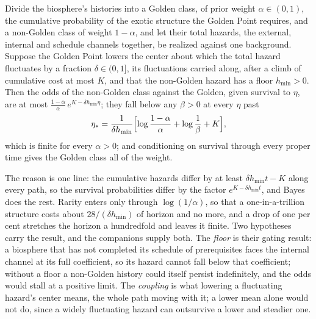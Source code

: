 \begin{proposition}\label{prop:emergence}
Divide the biosphere's histories into a Golden class, of prior weight
$\alpha\in(0,1)$, the cumulative probability of the exotic structure the
Golden Point requires, and a non-Golden class of weight $1-\alpha$, and
let their total hazards, the external, internal and schedule channels
together, be realized against one background. Suppose the Golden Point
lowers the center about which the total hazard fluctuates by a fraction
$\delta\in(0,1]$, its fluctuations carried along, after a climb of
cumulative cost at most $K$, and that the non-Golden hazard has a floor
$h_{\min}>0$. Then the odds of the non-Golden class against the Golden,
given survival to $\eta$, are at most
$\frac{1-\alpha}{\alpha}\,e^{K-\delta h_{\min}\eta}$; they fall below any
$\beta>0$ at every $\eta$ past
\[
\eta_\ast=\frac{1}{\delta h_{\min}}\Bigl[\log\frac{1-\alpha}{\alpha}
+\log\frac{1}{\beta}+K\Bigr],
\]
which is finite for every $\alpha>0$; and conditioning on survival through
every proper time gives the Golden class all of the weight.
\end{proposition}

\noindent The reason is one line: the cumulative hazards differ by at least
$\delta h_{\min}t-K$ along every path, so the survival probabilities differ
by the factor $e^{K-\delta h_{\min}t}$, and Bayes does the rest. Rarity
enters only through $\log(1/\alpha)$, so that a one-in-a-trillion structure
costs about $28/(\delta h_{\min})$ of horizon and no more, and a drop of one
per cent stretches the horizon a hundredfold and leaves it finite. Two
hypotheses carry the result, and the companions supply both. The
\emph{floor} is their gating result: a biosphere that has not completed its
schedule of prerequisites faces the internal channel at its full
coefficient, so its hazard cannot fall below that coefficient; without a
floor a non-Golden history could itself persist indefinitely, and the odds
would stall at a positive limit. The \emph{coupling} is what lowering a
fluctuating hazard's center means, the whole path moving with it; a lower
mean alone would not do, since a widely fluctuating hazard can outsurvive a
lower and steadier one.

